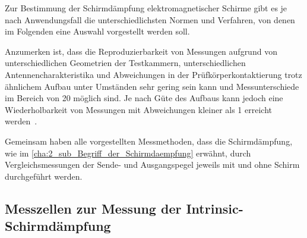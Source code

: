 
Zur Bestimmung der Schirmdämpfung elektromagnetischer Schirme gibt es je nach Anwendungsfall die unterschiedlichsten Normen und Verfahren, von denen im Folgenden eine Auswahl vorgestellt werden soll.
\par
\vspace{\linespace}
Anzumerken ist, dass die Reproduzierbarkeit von Messungen aufgrund von unterschiedlichen Geometrien der Testkammern, unterschiedlichen Antennencharakteristika und Abweichungen in der Prüfkörperkontaktierung trotz ähnlichem Aufbau unter Umständen sehr gering sein kann und Messunterschiede im Bereich von \SI{20}{\Dezibel} möglich sind. Je nach Güte des Aufbaus kann jedoch eine Wiederholbarkeit von Messungen mit Abweichungen kleiner als \SI{1}{\Dezibel} erreicht werden~\cite{EM_Schirmung}.
\par
\vspace{\linespace}
Gemeinsam haben alle vorgestellten Messmethoden, dass die Schirmdämpfung, wie im \Abschnitt\ref{cha:2_sub_Begriff_der_Schirmdaempfung} erwähnt, durch Vergleichsmessungen der Sende- und Ausgangspegel jeweils mit und ohne Schirm durchgeführt werden. 


\subsection{Messzellen zur Messung der Intrinsic-Schirmdämpfung}

